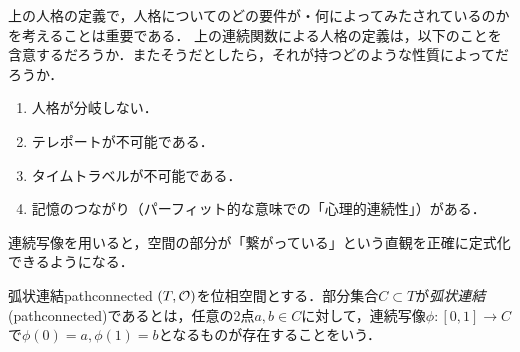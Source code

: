 \documentclass[11pt,a4paper, dvipdfmx]{jsarticle}
\begin{document}
\begin{renshu}{}{}
上の人格の定義で，人格についてのどの要件が・何によってみたされているのかを考えることは重要である．
上の連続関数による人格の定義は，以下のことを含意するだろうか．またそうだとしたら，それが持つどのような性質によってだろうか．
\begin{enumerate}
  \item 人格が分岐しない．
  \item テレポートが不可能である．
  \item タイムトラベルが不可能である．
  \item 記憶のつながり（パーフィット的な意味での「心理的連続性」）がある．
\end{enumerate}
\end{renshu}







連続写像を用いると，空間の部分が「繋がっている」という直観を正確に定式化できるようになる．

\begin{dfn}{弧状連結}{pathconnected}
  $(T,\mathcal{O})$を位相空間とする．部分集合$C \subset T$が\emph{弧状連結}(pathconnected)であるとは，任意の2点$a, b \in C$に対して，連続写像$\phi: [0,1] \to C$で$\phi(0)=a, \phi(1)=b$となるものが存在することをいう．
\end{dfn}
\end{document}
